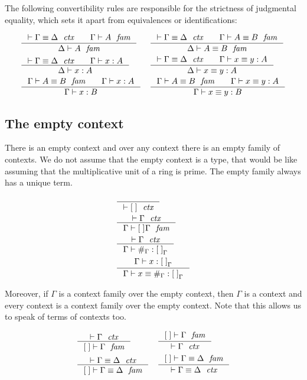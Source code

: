 The following convertibility rules are responsible for the strictness
of judgmental equality, which sets it apart from equivalences or identifications:

\begin{align*}
& \inference{\jctxeq{\Gamma}{\Delta}\qquad\jfam{\Gamma}{A}}{\jfam{\Delta}{A}}
& & \inference{\jctxeq{\Gamma}{\Delta}\qquad\jfameq{\Gamma}{A}{B}}{\jfameq{\Delta}{A}{B}}\\
& \inference{\jctxeq{\Gamma}{\Delta}\qquad\jterm{\Gamma}{A}{x}}{\jterm{\Delta}{A}{x}}
& & \inference{\jctxeq{\Gamma}{\Delta}\qquad\jtermeq{\Gamma}{A}{x}{y}}{\jtermeq{\Delta}{A}{x}{y}}\\
& \inference{\jfameq{\Gamma}{A}{B}\qquad \jterm{\Gamma}{A}{x}}{\jterm{\Gamma}{B}{x}}
& & \inference{\jfameq{\Gamma}{A}{B}\qquad\jtermeq{\Gamma}{A}{x}{y}}{\jtermeq{\Gamma}{B}{x}{y}}
\end{align*}

\subsection{The empty context}
There is an empty context and over any context there is an empty family of
contexts. We do not assume that the empty context is a type, that would be like
assuming that the multiplicative unit of a ring is prime. The empty family
always has a unique term. 

\begin{align}
& \inference{}{\jctx{\emptyc}}\\
& \inference{\jctx{\Gamma}}{\jfam{\Gamma}{\emptyf\Gamma}}\\
& \inference{\jctx{\Gamma}}{\jterm{\Gamma}{\emptyf[\Gamma]}{\emptytm[\Gamma]}}\\
& \inference{\jterm{\Gamma}{\emptyf[\Gamma]}{x}}{\jtermeq{\Gamma}{\emptyf[\Gamma]}{x}{\emptytm[\Gamma]}}
\end{align}

Moreover, if $\Gamma$ is a context family over the
empty context, then $\Gamma$ is a context and every context is a context
family over the empty context. Note that this allows us to speak
of terms of contexts too.

\begin{align}
& \inference{\jctx{\Gamma}}{\jfam{\emptyc}{\Gamma}} 
& & \inference{\jfam{\emptyc}{\Gamma}}{\jctx{\Gamma}}\\
& \inference{\jctxeq{\Gamma}{\Delta}}{\jfameq{\emptyc}{\Gamma}{\Delta}}
& & \inference{\jfameq{\emptyc}{\Gamma}{\Delta}}{\jctxeq{\Gamma}{\Delta}}
\end{align}

